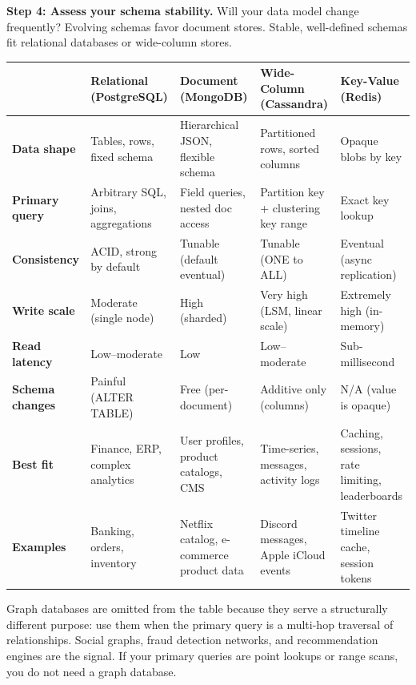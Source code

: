 \documentclass[11pt,a4paper]{article}
\begin{document}
\textbf{Step 4: Assess your schema stability.} Will your data model change frequently? Evolving schemas favor document stores. Stable, well-defined schemas fit relational databases or wide-column stores.

\begin{center}
\renewcommand{\arraystretch}{1.5}
\begin{tabularx}{\textwidth}{p{2.8cm}XXXX}
\toprule
\textbf{} & \textbf{Relational (PostgreSQL)} & \textbf{Document (MongoDB)} & \textbf{Wide-Column (Cassandra)} & \textbf{Key-Value (Redis)} \\
\midrule
\textbf{Data shape} & Tables, rows, fixed schema & Hierarchical JSON, flexible schema & Partitioned rows, sorted columns & Opaque blobs by key \\
\textbf{Primary query} & Arbitrary SQL, joins, aggregations & Field queries, nested doc access & Partition key + clustering key range & Exact key lookup \\
\textbf{Consistency} & ACID, strong by default & Tunable (default eventual) & Tunable (ONE to ALL) & Eventual (async replication) \\
\textbf{Write scale} & Moderate (single node) & High (sharded) & Very high (LSM, linear scale) & Extremely high (in-memory) \\
\textbf{Read latency} & Low--moderate & Low & Low--moderate & Sub-millisecond \\
\textbf{Schema changes} & Painful (ALTER TABLE) & Free (per-document) & Additive only (columns) & N/A (value is opaque) \\
\textbf{Best fit} & Finance, ERP, complex analytics & User profiles, product catalogs, CMS & Time-series, messages, activity logs & Caching, sessions, rate limiting, leaderboards \\
\textbf{Examples} & Banking, orders, inventory & Netflix catalog, e-commerce product data & Discord messages, Apple iCloud events & Twitter timeline cache, session tokens \\
\bottomrule
\end{tabularx}
\end{center}

\bigskip

Graph databases are omitted from the table because they serve a structurally different purpose: use them when the primary query is a multi-hop traversal of relationships. Social graphs, fraud detection networks, and recommendation engines are the signal. If your primary queries are point lookups or range scans, you do not need a graph database.
\end{document}

